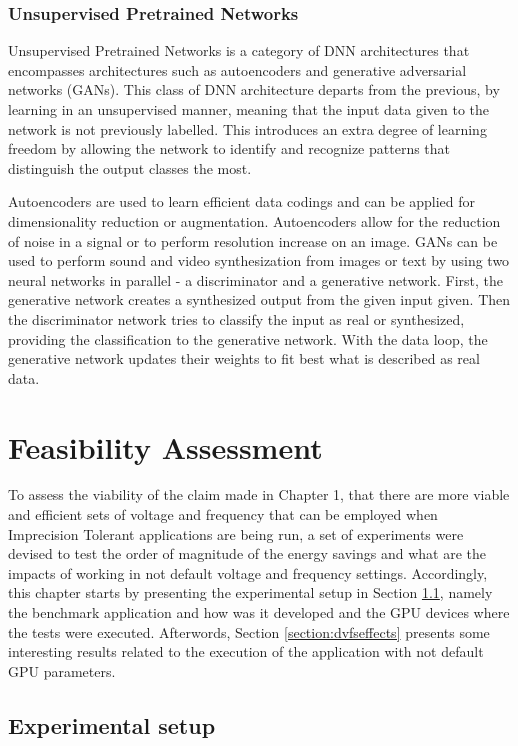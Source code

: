 \subsubsection{Unsupervised Pretrained Networks}


Unsupervised Pretrained Networks is a category of DNN architectures that encompasses architectures such as autoencoders and generative adversarial networks (GANs). This class of DNN architecture departs from the previous, by learning in an unsupervised manner, meaning that the input data given to the network is not previously labelled. This introduces an extra degree of learning freedom by allowing the network to identify and recognize patterns that distinguish the output classes the most.

Autoencoders are used to learn efficient data codings and can be applied for dimensionality reduction or augmentation. Autoencoders allow for the reduction of noise in a signal or to perform resolution increase on an image. GANs can be used to perform sound and video synthesization from images or text by using two neural networks in parallel - a discriminator and a generative network. First, the generative network creates a synthesized output from the given input given. Then the discriminator network tries to classify the input as real or synthesized, providing the classification to the generative network. With the data loop, the generative network updates their weights to fit best what is described as real data.



\section{Feasibility Assessment}
To assess the viability of the claim made in Chapter 1, that there are more viable and efficient sets of voltage and frequency that can be employed when Imprecision Tolerant applications are being run, a set of experiments were devised to test the order of magnitude of the energy savings and what are the impacts of working in not default voltage and frequency settings. Accordingly, this chapter starts by presenting the experimental setup in Section \ref{section:experimental_setup}, namely the benchmark application and how was it developed and the GPU devices where the tests were executed. Afterwords, Section \ref{section:dvfseffects} presents some interesting results related to the execution of the application with not default GPU parameters.


\subsection{Experimental setup}
\label{section:experimental_setup}

